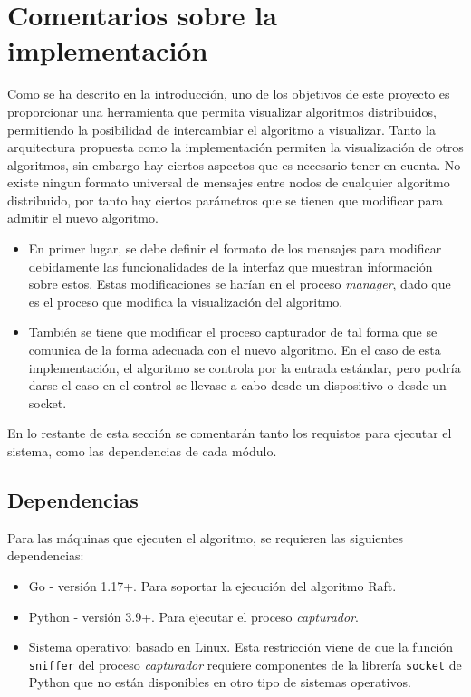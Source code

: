 \section{Comentarios sobre la implementación}

Como se ha descrito en la introducción, uno de los objetivos de este proyecto es proporcionar una herramienta que permita visualizar algoritmos distribuidos, permitiendo la posibilidad de intercambiar el algoritmo a visualizar. Tanto la arquitectura propuesta como la implementación permiten la visualización de otros algoritmos, sin embargo hay ciertos aspectos que es necesario tener en cuenta. No existe ningun formato universal de mensajes entre nodos de cualquier algoritmo distribuido, por tanto hay ciertos parámetros que se tienen que modificar para admitir el nuevo algoritmo.

\begin{itemize}
\item En primer lugar, se debe definir el formato de los mensajes para modificar debidamente las funcionalidades de la interfaz que muestran información sobre estos. Estas modificaciones se harían en el proceso \textit{manager}, dado que es el proceso que modifica la visualización del algoritmo.

\item También se tiene que modificar el proceso capturador de tal forma que se comunica de la forma adecuada con el nuevo algoritmo. En el caso de esta implementación, el algoritmo se controla por la entrada estándar, pero podría darse el caso en el control se llevase a cabo desde un dispositivo o desde un socket.
\end{itemize}

En lo restante de esta sección se comentarán tanto los requistos para ejecutar el sistema, como las dependencias de cada módulo.

\subsection{Dependencias}

Para las máquinas que ejecuten el algoritmo, se requieren las siguientes dependencias:

\begin{itemize}
\item Go - versión 1.17+. Para soportar la ejecución del algoritmo Raft.
\item Python - versión 3.9+. Para ejecutar el proceso \textit{capturador}.
\item Sistema operativo: basado en Linux. Esta restricción viene de que la función \texttt{sniffer} del proceso \textit{capturador} requiere componentes de la librería \texttt{socket} de Python que no están disponibles en otro tipo de sistemas operativos.
\end{itemize}

